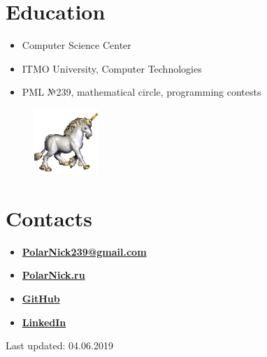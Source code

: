 \documentclass[11pt,oneside]{article}
\newcommand{\hhref}[2]{\href{#1}{\color{blue}#2}}
\begin{document}
\vspace{-9pt}
\section*{\textbf{Education}}
\vspace{-9pt}

\begin{itemize}
    \item{Computer Science Center}
    \item{ITMO University, Computer Technologies}
    \item{PML №239, mathematical circle, programming contests}
\end{itemize}

\begin{figure}
    \centering
    \includegraphics[width=0.22\textwidth]{unicorn.png}
\end{figure}

\vspace{-9pt}
\section*{\textbf{Contacts}}
\vspace{-9pt}

\begin{itemize}

    \item{\textbf{\hhref{mailto:PolarNick239@gmail.com}{PolarNick239@gmail.com}}}

    \item{\textbf{\hhref{http://polarnick239.github.io/index_ru.html}{PolarNick.ru}}}

    \item{\textbf{\hhref{https://github.com/PolarNick239}{GitHub}}}

    \item{\textbf{\hhref{https://www.linkedin.com/in/nickolay-polyarniy-61393b7b}{LinkedIn}}}

\end{itemize}

Last updated: 04.06.2019
\end{document}
